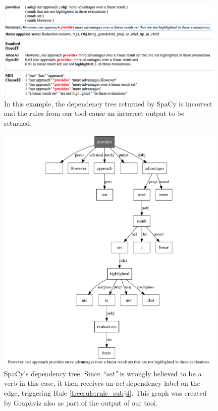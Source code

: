 \documentclass[11pt,a4paper,openright]{memoir}
\begin{document}
\begin{figure}[!htbp]
  \centering
    \includegraphics[width=1.0\textwidth]{./images/ours-vs-clauseie-2}
  \caption[In this example, the dependency tree returned by SpaCy is incorrect.]{In this example, the dependency tree returned by SpaCy is incorrect and the rules from our tool cause an incorrect output to be returned.}
  \label{fig:our_tool_comparison2}
\end{figure}


\begin{figure}[!htbp]
  \centering
    \includegraphics[width=1.0\textwidth]{./images/sentence-164-3}
  \caption[SpaCy's dependency tree.]{SpaCy's dependency tree. Since \emph{\enquote{set}} is wrongly believed to be a verb in this case, it then receives an \emph{acl} dependency label on the edge, triggering Rule \ref{treerule:rule_subj4}. This graph was created by Graphviz also as part of the output of our tool.}
  \label{fig:our_tool_output_sentence}
\end{figure}
\end{document}
